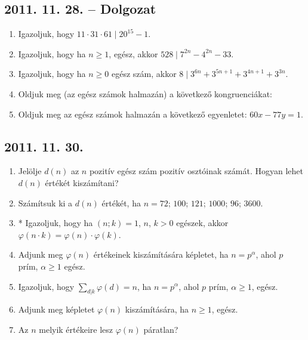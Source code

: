 	\subsection*{2011. 11. 28. -- Dolgozat}
	\begin{enumerate}
		\item Igazoljuk, hogy $11\cdot31\cdot61\mid 20^{15}-1$.
		\item Igazoljuk, hogy ha $n\ge1$, egész, akkor $528\mid 7^{2n}-4^{2n}-33$.
		\item Igazoljuk, hogy ha $n\ge0$ egész szám, akkor $8\mid 3^{6n}+3^{5n+1}+3^{4n+1}+3^{3n}$.
		\item Oldjuk meg (az egész számok halmazán) a következő kongruenciákat:
		\item Oldjuk meg az egész számok halmazán a következő egyenletet: $60x-77y=1$.
	\end{enumerate}
	
	
	\subsection*{2011. 11. 30.}
	\begin{enumerate}
		\item Jelölje $d(n)$ az $n$ pozitív egész szám pozitív osztóinak számát. Hogyan lehet $d(n)$ értékét kiszámítani?
		\item Számítsuk ki a $d(n)$ értékét, ha $n = 72$; $100$; $121$; $1000$; $96$; $3600$.
		\item * Igazoljuk, hogy ha $(n;k)=1$, $n$, $k>0$ egészek, akkor $\varphi(n\cdot k)=\varphi(n)\cdot\varphi(k)$.
		\item Adjunk meg $\varphi(n)$ értékeinek kiszámítására képletet, ha $n=p^{\alpha}$, ahol $p$ prím, $\alpha\ge1$ egész.
		\item Igazoljuk, hogy $\sum\limits_{d|k}\varphi(d)=n$, ha $n=p^{\alpha}$, ahol $p$ prím, $\alpha\ge1$, egész.
		\item Adjunk meg képletet $\varphi(n)$ kiszámítására, ha $n\ge1$, egész.
		\item Az $n$ melyik értékeire lesz $\varphi(n)$ páratlan?
	\end{enumerate}
	
	
